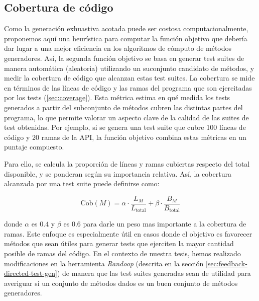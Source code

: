 \subsection{Cobertura de código}
\label{sec:fitnessRandoop}

Como la generación exhuastiva acotada puede ser costosa computacionalmente,
proponemos aquí una heurística para computar la función objetivo que debería
dar lugar a una mejor eficiencia en los algoritmos de cómputo de métodos
generadores. Así, la segunda función objetivo se basa en generar test suites
de manera automática (aleatoria) utilizando un suconjunto candidato de métodos,  
y medir la cobertura de código que alcanzan estas test suites. 
La cobertura se mide en términos de las líneas de código y las ramas del
programa que son ejercitadas por los tests (\ref{sec:coverage}).
Esta métrica estima en qué medida los tests generados a partir del subconjunto de métodos cubren las distintas partes del programa, 
lo que permite valorar un aspecto clave de la calidad de las suites de test obtenidas.
Por ejemplo, si se genera una test suite que cubre 100 líneas de código y 20 ramas de la API, 
la función objetivo combina estas métricas en un puntaje compuesto.

Para ello, se calcula la proporción de líneas y ramas cubiertas respecto del total disponible, 
y se ponderan según su importancia relativa. Así, la cobertura alcanzada por una
test suite puede definirse como:

\[
\text{Cob}(M) = \alpha \cdot \frac{L_M}{L_{\text{total}}} + \beta \cdot \frac{B_M}{B_{\text{total}}}
\]

donde $\alpha$ es $0.4$ y $\beta$ es $0.6$ para darle un peso mas importante a la cobertura de ramas.
Este enfoque es especialmente útil en casos donde el objetivo es favorecer
métodos que sean útiles para generar tests que ejerciten la mayor cantidad
posible de ramas del código.
En el contexto de nuestra tesis, hemos realizado modificaciones en la
herramienta \emph{Randoop} (descrita en la sección
\ref{sec:feedback-directed-test-gen})
de manera que las test suites generadas sean de utilidad para averiguar si un conjunto de 
métodos dados es un buen conjunto de métodos generadores.

